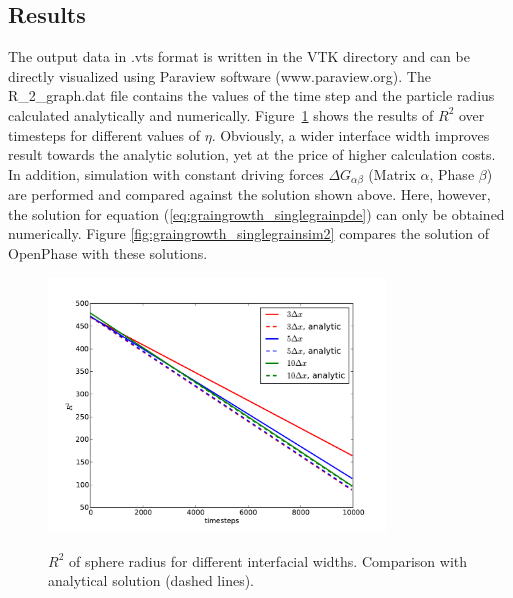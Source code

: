 \subsection{Results}
\label{sec:example_graingrowth_results}
The output data in .vts format is written in the VTK directory and can be directly 
visualized using Paraview software (www.paraview.org). The R\_2\_graph.dat file contains the values of the time step and the particle radius calculated analytically and numerically.
Figure~\ref{fig:graingrowth_singlegrainsim1} shows the results of $R^2$ over timesteps for different values of $\eta$. Obviously, a wider interface width improves result towards the analytic solution, yet at the price of higher calculation costs. In addition, simulation with constant driving forces $\Delta G_{\alpha\beta}$ (Matrix $\alpha$, Phase $\beta$) are performed and compared against the solution shown above. Here, however, the solution for equation (\ref{eq:graingrowth_singlegrainpde}) can only be obtained numerically. Figure \ref{fig:graingrowth_singlegrainsim2} compares the solution of OpenPhase with these solutions.
\begin{figure}[p]
\centering
\includegraphics[width=0.8\textwidth]{Figures/examples/R2NDIF.pdf}
\label{fig:graingrowth_singlegrainsim1}
\caption{$R^2$ of sphere radius for different interfacial widths. Comparison with analytical solution (dashed lines).} 
\end{figure}
